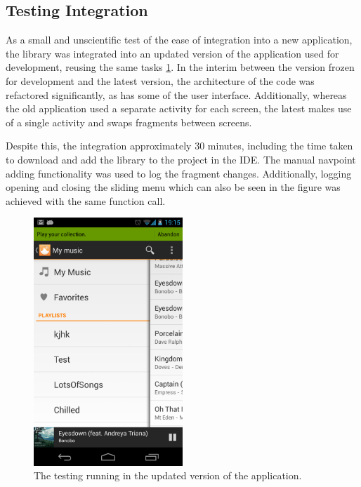 \subsection{Testing Integration}

As a small and unscientific test of the ease of integration into a
new application, the library was integrated into an updated version
of the application used for development, reusing the same tasks
\ref{fig:updated-application}. In the interim between the version
frozen for development and the latest version, the architecture of
the code was refactored significantly, as has some of the user
interface. Additionally, whereas the old application used a separate
activity for each screen, the latest makes use of a single activity
and swaps fragments between screens.

Despite this, the integration approximately 30 minutes, including the time taken
to download and add the library to the project in the IDE. The manual
navpoint adding functionality was used to log the fragment changes. Additionally,
logging opening and closing the sliding menu which can also be seen in
the figure was achieved with the same function call.

\begin{figure}[h]
  \centering 
  \includegraphics[width=0.5\textwidth]{images/updated-application}
  \caption{The testing running in the updated version of the application.}
  \label{fig:updated-application}
\end{figure}

